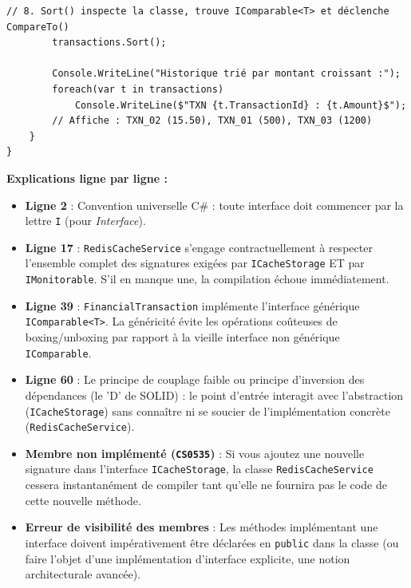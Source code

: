 \begin{lstlisting}[caption={Implémentation multiple et interfaces de tri natives}]
        // 8. Sort() inspecte la classe, trouve IComparable<T> et déclenche CompareTo()
        transactions.Sort(); 
        
        Console.WriteLine("Historique trié par montant croissant :");
        foreach(var t in transactions)
            Console.WriteLine($"TXN {t.TransactionId} : {t.Amount}$");
        // Affiche : TXN_02 (15.50), TXN_01 (500), TXN_03 (1200)
    }
}
\end{lstlisting}

\textbf{Explications ligne par ligne :}
\begin{itemize}
    \item \textbf{Ligne 2} : Convention universelle C\# : toute interface doit commencer par la lettre \texttt{I} (pour \textit{Interface}).
    \item \textbf{Ligne 17} : \texttt{RedisCacheService} s'engage contractuellement à respecter l'ensemble complet des signatures exigées par \texttt{ICacheStorage} ET par \texttt{IMonitorable}. S'il en manque une, la compilation échoue immédiatement.
    \item \textbf{Ligne 39} : \texttt{FinancialTransaction} implémente l'interface générique \texttt{IComparable<T>}. La généricité évite les opérations coûteuses de boxing/unboxing par rapport à la vieille interface non générique \texttt{IComparable}.
    \item \textbf{Ligne 60} : Le principe de couplage faible ou principe d'inversion des dépendances (le 'D' de SOLID) : le point d'entrée interagit avec l'abstraction (\texttt{ICacheStorage}) sans connaître ni se soucier de l'implémentation concrète (\texttt{RedisCacheService}).
\end{itemize}

\begin{tcolorbox}[colback=white,colframe=keywordcolor,title=\textbf{Pièges courants \& Erreurs de compilation}]
    \begin{itemize}
        \item \textbf{Membre non implémenté (\texttt{CS0535})} : Si vous ajoutez une nouvelle signature dans l'interface \texttt{ICacheStorage}, la classe \texttt{RedisCacheService} cessera instantanément de compiler tant qu'elle ne fournira pas le code de cette nouvelle méthode.
        \item \textbf{Erreur de visibilité des membres} : Les méthodes implémentant une interface doivent impérativement être déclarées en \texttt{public} dans la classe (ou faire l'objet d'une implémentation d'interface explicite, une notion architecturale avancée).
    \end{itemize}
\end{tcolorbox}

